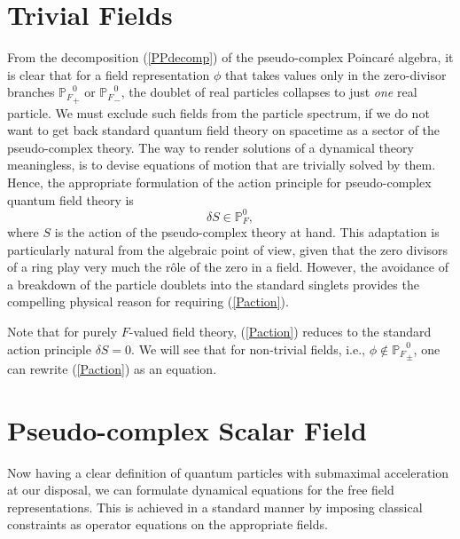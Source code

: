 \documentclass[a4paper,aps,prd,showkeys,showpacs,superscriptaddress,preprint]{revtex4}
\newcommand{\pc}{\mathbb{P}}
\begin{document}
\section{Trivial Fields\label{sec_AP}}
From the decomposition (\ref{PPdecomp}) of the pseudo-complex
Poincar\'e algebra, it is clear that for a
field representation $\phi$ that takes values only in the zero-divisor
branches ${\pc_{F}}_+^0$ or
${\pc_{F}}_-^0$, the doublet
of real particles collapses to just \textsl{one} real particle. We
must exclude such fields from the particle spectrum, if we do not want
to get back standard quantum field theory on spacetime as a sector of
the pseudo-complex theory. The way to render solutions of a dynamical
theory meaningless, is to devise equations of motion that are
trivially solved by them. Hence, the appropriate formulation of the
action principle for pseudo-complex quantum field theory is
\begin{equation}\label{Paction}
  \delta S \in \pc_F^0,
\end{equation} 
where $S$ is the action of the pseudo-complex theory at hand. 
This adaptation is particularly natural from the algebraic point of view, given
that the zero divisors of a ring play very much the r\^ole of the zero
in a field. However, the avoidance of a breakdown of the particle
doublets into the standard singlets provides the compelling physical
reason for requiring (\ref{Paction}).

Note that for purely $F$-valued field theory, (\ref{Paction}) reduces to the
standard action principle $\delta S = 0$. We will see that for
non-trivial fields, i.e.,  $\phi \not\in {\pc_{F}}_\pm^0$, one can rewrite
(\ref{Paction}) as an equation.


\section{Pseudo-complex Scalar Field\label{sec_pcFT}}
Now having a clear definition of quantum particles with submaximal
acceleration at our disposal, we can formulate dynamical equations for
the free field representations. This is achieved in a standard manner
by imposing classical constraints as operator equations on the
appropriate fields.
\end{document}
